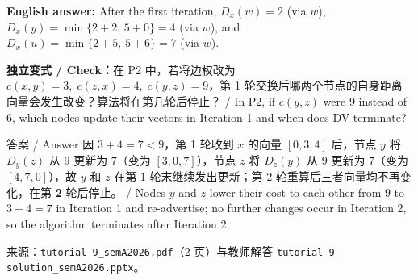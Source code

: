 \textbf{English answer:} After the first iteration, $D_x(w) = 2$ (via $w$), $D_x(y) = \min\{2+2,\,5+0\} = 4$ (via $w$), and $D_x(u) = \min\{2+5,\,5+6\} = 7$ (via $w$).

\textbf{独立变式 / Check：}在 P2 中，若将边权改为 $c(x,y)=3,\; c(z,x)=4,\; c(y,z)=9$，第 1 轮交换后哪两个节点的自身距离向量会发生改变？算法将在第几轮后停止？ / In P2, if $c(y,z)$ were $9$ instead of $6$, which nodes update their vectors in Iteration 1 and when does DV terminate?

\begin{StudySolution}{答案 / Answer}
因 $3 + 4 = 7 < 9$，第 1 轮收到 $x$ 的向量 $[0,3,4]$ 后，节点 $y$ 将 $D_y(z)$ 从 $9$ 更新为 $7$（变为 $[3,0,7]$），节点 $z$ 将 $D_z(y)$ 从 $9$ 更新为 $7$（变为 $[4,7,0]$），故 $y$ 和 $z$ 在第 1 轮末继续发出更新；第 2 轮重算后三者向量均不再变化，在第 \textbf{2} 轮后停止。 / Nodes $y$ and $z$ lower their cost to each other from $9$ to $3+4=7$ in Iteration 1 and re-advertise; no further changes occur in Iteration 2, so the algorithm terminates after Iteration 2.
\end{StudySolution}

来源：\texttt{tutorial-9\_semA2026.pdf}（2 页）与教师解答 \texttt{tutorial-9-solution\_semA2026.pptx}。
